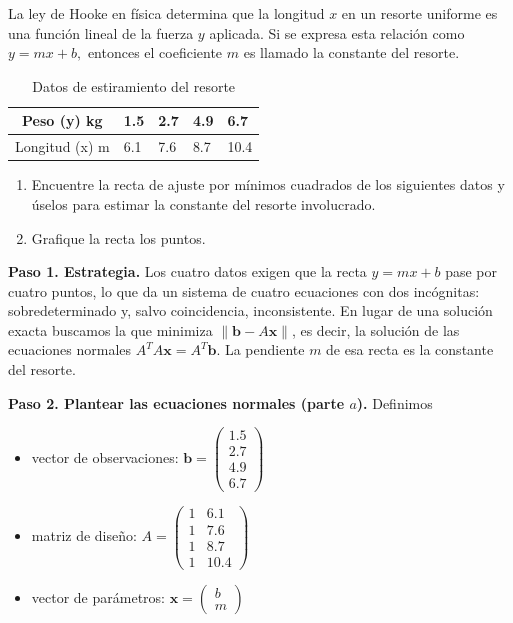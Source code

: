 \begin{example}
La ley de Hooke en física determina que la longitud $x$ en un resorte uniforme es una función lineal de la fuerza $y$ aplicada. Si se expresa esta relación como $y=mx+b,$ entonces el coeficiente $m$ es llamado la constante del resorte.

\begin{table}[H]
\centering
\begin{tabular}{|c|l|l|l|l|}
\hline
Peso (y) kg  & 1.5   & 2.7   & 4.9  & 6.7    \\ \hline
Longitud (x) m & 6.1 & 7.6 & 8.7 & 10.4 \\ \hline
\end{tabular}
\caption{Datos de estiramiento del resorte}
\end{table}  

\begin{enumerate}[$(a)$]
\item Encuentre la recta de ajuste por mínimos cuadrados de los siguientes datos y úselos para estimar la constante del resorte involucrado.
\item Grafique la recta los puntos.
\end{enumerate}

\begin{myproof}
\textbf{Paso 1. Estrategia.} Los cuatro datos exigen que la recta $y = mx + b$ pase por cuatro puntos, lo que da un sistema de cuatro ecuaciones con dos incógnitas: sobredeterminado y, salvo coincidencia, inconsistente. En lugar de una solución exacta buscamos la que minimiza $\|\mathbf{b} - A\mathbf{x}\|$, es decir, la solución de las ecuaciones normales $A^TA\mathbf{x} = A^T\mathbf{b}$. La pendiente $m$ de esa recta es la constante del resorte.

\textbf{Paso 2. Plantear las ecuaciones normales (parte $a$).} Definimos
\begin{itemize}
\item vector de observaciones: \(\mathbf{b} = \begin{pmatrix} 1.5 \\ 2.7 \\ 4.9 \\ 6.7 \end{pmatrix}\)
\item matriz de diseño: \(A = \begin{pmatrix} 1 & 6.1 \\ 1 & 7.6 \\ 1 & 8.7 \\ 1 & 10.4 \end{pmatrix}\)
\item vector de parámetros: \(\mathbf{x} = \begin{pmatrix} b \\ m \end{pmatrix}\)
\end{itemize}


\end{myproof}
\end{example}
